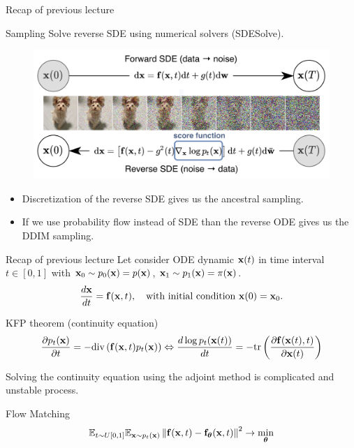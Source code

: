 \begin{frame}{Recap of previous lecture}
	\begin{block}{Sampling}
		Solve reverse SDE using numerical solvers (SDESolve).
		\begin{figure}
			\includegraphics[width=0.8\linewidth]{figs/sbgm}
		\end{figure}
		\vspace{-0.5cm}
	\end{block}
	\begin{itemize}
		\item Discretization of the reverse SDE gives us the ancestral sampling.
		\item If we use probability flow instead of SDE than the reverse ODE gives us the DDIM sampling.
	\end{itemize}
\end{frame}
\begin{frame}{Recap of previous lecture}
	Let consider ODE dynamic $\mathbf{x}(t)$ in time interval $t \in [0, 1]$ with $\mathbf{x}_0 \sim p_0(\mathbf{x}) = p(\mathbf{x})$, $\mathbf{x}_1 \sim p_1(\mathbf{x}) =  \pi(\mathbf{x})$.
	\[
		\frac{d \mathbf{x}}{dt} = \mathbf{f} (\mathbf{x}, t),  \quad \text{with initial condition }\mathbf{x}(0) = \mathbf{x}_0.
	\]
	\vspace{-0.5cm}
	\begin{block}{KFP theorem (continuity equation)}
		\vspace{-0.5cm}
		\[
			\frac{\partial p_t(\mathbf{x})}{\partial t} = - \text{div}\left(\mathbf{f}(\mathbf{x}, t) p_t(\mathbf{x})\right) \Leftrightarrow \frac{d \log p_t(\mathbf{x}(t))}{d t} = - \text{tr} \left( \frac{\partial \mathbf{f}(\mathbf{x}(t), t)}{\partial \mathbf{x}(t)} \right)
		\]
		\vspace{-0.3cm}
	\end{block}
	Solving the continuity equation using the adjoint method is complicated and unstable process.
	\begin{block}{Flow Matching}
		\vspace{-0.3cm}
		\[
			\mathbb{E}_{t \sim U[0, 1]} \mathbb{E}_{\mathbf{x} \sim p_t(\mathbf{x})}\left\| \mathbf{f}(\mathbf{x}, t) - \mathbf{f}_{\boldsymbol{\theta}}(\mathbf{x}, t) \right\|^2 \rightarrow \min_{\boldsymbol{\theta}}
		\]
		\vspace{-0.3cm}
	\end{block}
\end{frame}
